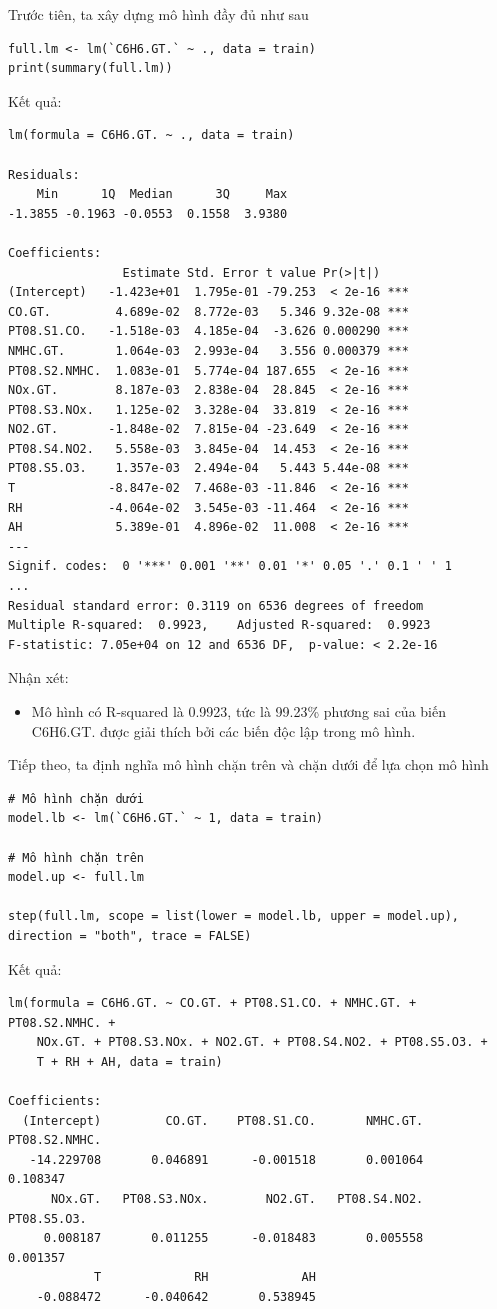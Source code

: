 Trước tiên, ta xây dựng mô hình đầy đủ như sau

\begin{lstlisting}
full.lm <- lm(`C6H6.GT.` ~ ., data = train)
print(summary(full.lm))
\end{lstlisting}
Kết quả:
\begin{lstlisting}
lm(formula = C6H6.GT. ~ ., data = train)

Residuals:
    Min      1Q  Median      3Q     Max 
-1.3855 -0.1963 -0.0553  0.1558  3.9380 

Coefficients:
                Estimate Std. Error t value Pr(>|t|)    
(Intercept)   -1.423e+01  1.795e-01 -79.253  < 2e-16 ***
CO.GT.         4.689e-02  8.772e-03   5.346 9.32e-08 ***
PT08.S1.CO.   -1.518e-03  4.185e-04  -3.626 0.000290 ***
NMHC.GT.       1.064e-03  2.993e-04   3.556 0.000379 ***
PT08.S2.NMHC.  1.083e-01  5.774e-04 187.655  < 2e-16 ***
NOx.GT.        8.187e-03  2.838e-04  28.845  < 2e-16 ***
PT08.S3.NOx.   1.125e-02  3.328e-04  33.819  < 2e-16 ***
NO2.GT.       -1.848e-02  7.815e-04 -23.649  < 2e-16 ***
PT08.S4.NO2.   5.558e-03  3.845e-04  14.453  < 2e-16 ***
PT08.S5.O3.    1.357e-03  2.494e-04   5.443 5.44e-08 ***
T             -8.847e-02  7.468e-03 -11.846  < 2e-16 ***
RH            -4.064e-02  3.545e-03 -11.464  < 2e-16 ***
AH             5.389e-01  4.896e-02  11.008  < 2e-16 ***
---
Signif. codes:  0 '***' 0.001 '**' 0.01 '*' 0.05 '.' 0.1 ' ' 1
...
Residual standard error: 0.3119 on 6536 degrees of freedom
Multiple R-squared:  0.9923,	Adjusted R-squared:  0.9923 
F-statistic: 7.05e+04 on 12 and 6536 DF,  p-value: < 2.2e-16
\end{lstlisting}
Nhận xét:
\begin{itemize}
    \item Mô hình có R-squared là 0.9923, tức là 99.23\% phương sai của biến C6H6.GT. được giải thích bởi các biến độc lập trong mô hình.
\end{itemize}

Tiếp theo, ta định nghĩa mô hình chặn trên và chặn dưới để lựa chọn mô hình
\begin{lstlisting}
# Mô hình chặn dưới
model.lb <- lm(`C6H6.GT.` ~ 1, data = train) 

# Mô hình chặn trên
model.up <- full.lm

step(full.lm, scope = list(lower = model.lb, upper = model.up), direction = "both", trace = FALSE)
\end{lstlisting}
Kết quả:
\begin{lstlisting}
lm(formula = C6H6.GT. ~ CO.GT. + PT08.S1.CO. + NMHC.GT. + PT08.S2.NMHC. + 
    NOx.GT. + PT08.S3.NOx. + NO2.GT. + PT08.S4.NO2. + PT08.S5.O3. + 
    T + RH + AH, data = train)

Coefficients:
  (Intercept)         CO.GT.    PT08.S1.CO.       NMHC.GT.  PT08.S2.NMHC.  
   -14.229708       0.046891      -0.001518       0.001064       0.108347  
      NOx.GT.   PT08.S3.NOx.        NO2.GT.   PT08.S4.NO2.    PT08.S5.O3.  
     0.008187       0.011255      -0.018483       0.005558       0.001357  
            T             RH             AH  
    -0.088472      -0.040642       0.538945  
\end{lstlisting}

